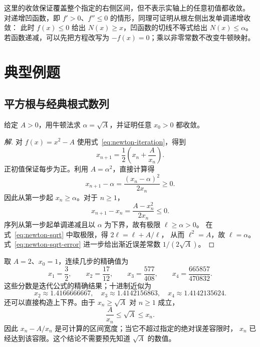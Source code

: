 \documentclass{ctexart}
\begin{document}
这里的收敛保证覆盖整个指定的右侧区间，但不表示实轴上的任意初值都收敛。
对递增凹函数，即 $f'>0$、$f''\le0$ 的情形，同理可证明从根左侧出发单调递增收敛：
此时 $f(x)\le0$ 给出 $N(x)\ge x$，凹函数的切线不等式给出 $N(x)\le\alpha$。
若函数递减，可以先把方程改写为 $-f(x)=0$；乘以非零常数不改变牛顿映射。

\section{典型例题}
\label{sec:newton-examples}

\subsection{平方根与经典根式数列}

\begin{example}[计算正平方根]\label{ex:newton-sqrt}
给定 $A>0$，用牛顿法求 $\alpha=\sqrt A$，并证明任意 $x_0>0$ 都收敛。
\end{example}

\begin{proof}[解]
对 $f(x)=x^2-A$ 使用式~\eqref{eq:newton-iteration}，得到
\begin{equation}\label{eq:newton-sqrt}
  x_{n+1}=\frac12\left(x_n+\frac{A}{x_n}\right).
\end{equation}
正初值保证每步为正。利用 $A=\alpha^2$，直接计算得
\begin{equation}\label{eq:newton-sqrt-error}
  x_{n+1}-\alpha=\frac{(x_n-\alpha)^2}{2x_n}\ge0.
\end{equation}
因此从第一步起 $x_n\ge\alpha$。对于 $n\ge1$，
\[
  x_{n+1}-x_n=\frac{A-x_n^2}{2x_n}\le0.
\]
序列从第一步起单调递减且以 $\alpha$ 为下界，故有极限 $\ell\ge\alpha>0$。
在式~\eqref{eq:newton-sqrt} 中取极限，得 $2\ell=\ell+A/\ell$，
从而 $\ell^2=A$，故 $\ell=\alpha$。
式~\eqref{eq:newton-sqrt-error} 进一步给出渐近误差常数 $1/(2\sqrt A)$。
\end{proof}

取 $A=2$、$x_0=1$，连续几步的精确值为
\[
  x_1=\frac32,\qquad x_2=\frac{17}{12},\qquad
  x_3=\frac{577}{408},\qquad x_4=\frac{665857}{470832}.
\]
这些分数是迭代公式的精确结果；十进制近似为
\[
  x_2\approx1.4166666667,\quad
  x_3\approx1.4142156863,\quad
  x_4\approx1.4142135624.
\]
还可以直接构造上下界。由于 $x_n\ge\sqrt A$ 对 $n\ge1$ 成立，
\[
  \frac{A}{x_n}\le\sqrt A\le x_n.
\]
因此 $x_n-A/x_n$ 是可计算的区间宽度；当它不超过指定的绝对误差容限时，
$x_n$ 已经达到该容限。这个结论不需要预先知道 $\sqrt A$ 的数值。
\end{document}
